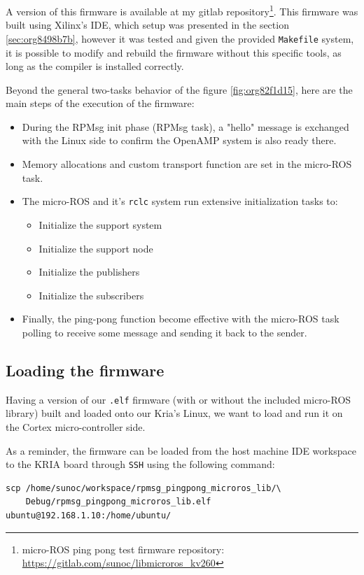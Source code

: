 \documentclass[10pt]{article}
\begin{document}
A version of this firmware is available at my gitlab repository\footnote{micro-ROS ping pong test firmware repository: \url{https://gitlab.com/sunoc/libmicroros\_kv260}}. This firmware was built using
Xilinx's IDE, which setup was presented in the section \ref{sec:org8498b7b}, however it was tested
and given the provided \texttt{Makefile} system, it is possible to modify and rebuild the firmware
without this specific tools, as long as the compiler is installed correctly.

Beyond the general two-tasks behavior of the figure \ref{fig:org82f1d15}, here are the main steps
of the execution of the firmware:
\begin{itemize}
\item During the RPMsg init phase (RPMsg task), a "hello" message is exchanged with the Linux side
to confirm the OpenAMP system is also ready there.
\item Memory allocations and custom transport function are set in the micro-ROS task.
\item The micro-ROS and it's \texttt{rclc} system run extensive initialization tasks to:
\begin{itemize}
\item Initialize the support system
\item Initialize the support node
\item Initialize the publishers
\item Initialize the subscribers
\end{itemize}
\item Finally, the ping-pong function become effective with the micro-ROS task
polling to receive some message and sending it back to the sender.
\end{itemize}


\clearpage
\subsection{Loading the firmware}
\label{sec:orgdcfbc49}
Having a version of our \texttt{.elf} firmware (with or without the included
micro-ROS library) built and loaded onto our Kria's Linux, we want to load and run it
on the Cortex micro-controller side.

As a reminder, the firmware can be loaded from the host machine IDE workspace
to the KRIA board through \texttt{SSH} using the following command:
\begin{verbatim}
scp /home/sunoc/workspace/rpmsg_pingpong_microros_lib/\
    Debug/rpmsg_pingpong_microros_lib.elf  ubuntu@192.168.1.10:/home/ubuntu/
\end{verbatim}
\end{document}
